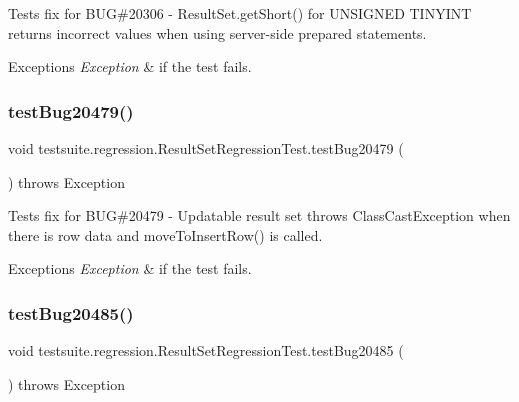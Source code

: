 Tests fix for B\+UG\#20306 -\/ Result\+Set.\+get\+Short() for U\+N\+S\+I\+G\+N\+ED T\+I\+N\+Y\+I\+NT returns incorrect values when using server-\/side prepared statements.


\begin{DoxyExceptions}{Exceptions}
{\em Exception} & if the test fails. \\
\hline
\end{DoxyExceptions}
\mbox{\label{classtestsuite_1_1regression_1_1_result_set_regression_test_ac51afa90e507daec20c3fe37a132b0de}} 
\subsubsection{\texorpdfstring{test\+Bug20479()}{testBug20479()}}
{\footnotesize\ttfamily void testsuite.\+regression.\+Result\+Set\+Regression\+Test.\+test\+Bug20479 (\begin{DoxyParamCaption}{ }\end{DoxyParamCaption}) throws Exception}

Tests fix for B\+UG\#20479 -\/ Updatable result set throws Class\+Cast\+Exception when there is row data and move\+To\+Insert\+Row() is called.


\begin{DoxyExceptions}{Exceptions}
{\em Exception} & if the test fails. \\
\hline
\end{DoxyExceptions}
\mbox{\label{classtestsuite_1_1regression_1_1_result_set_regression_test_a5e674e0b217a2731be3be70fa79f0007}} 
\subsubsection{\texorpdfstring{test\+Bug20485()}{testBug20485()}}
{\footnotesize\ttfamily void testsuite.\+regression.\+Result\+Set\+Regression\+Test.\+test\+Bug20485 (\begin{DoxyParamCaption}{ }\end{DoxyParamCaption}) throws Exception}

